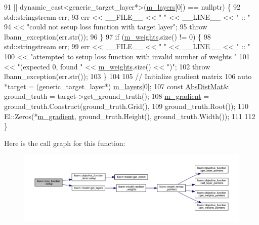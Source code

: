 \begin{DoxyCode}
91       || \textcolor{keyword}{dynamic\_cast<}generic\_target\_layer*\textcolor{keyword}{>}(\hyperlink{classlbann_1_1objective__function__term_a9269cf0a237eacd1e220ba2739f44334}{m\_layers}[0]) == \textcolor{keyword}{nullptr}) \{
92     std::stringstream err;
93     err << \_\_FILE\_\_ << \textcolor{stringliteral}{" "} << \_\_LINE\_\_ << \textcolor{stringliteral}{" :: "}
94         << \textcolor{stringliteral}{"could not setup loss function with target layer"};
95     \textcolor{keywordflow}{throw} lbann\_exception(err.str());
96   \}
97   \textcolor{keywordflow}{if} (\hyperlink{classlbann_1_1objective__function__term_a1d601c29153ae9cb54c585887608f2bf}{m\_weights}.size() != 0) \{
98     std::stringstream err;
99     err << \_\_FILE\_\_ << \textcolor{stringliteral}{" "} << \_\_LINE\_\_ << \textcolor{stringliteral}{" :: "}
100         << \textcolor{stringliteral}{"attempted to setup loss function with invalid number of weights "}
101         << \textcolor{stringliteral}{"(expected 0, found "} << \hyperlink{classlbann_1_1objective__function__term_a1d601c29153ae9cb54c585887608f2bf}{m\_weights}.size() << \textcolor{stringliteral}{")"};
102     \textcolor{keywordflow}{throw} lbann\_exception(err.str());
103   \}
104 
105   \textcolor{comment}{// Initialize gradient matrix}
106   \textcolor{keyword}{auto} *target = (generic\_target\_layer*) \hyperlink{classlbann_1_1objective__function__term_a9269cf0a237eacd1e220ba2739f44334}{m\_layers}[0];
107   \textcolor{keyword}{const} \hyperlink{base_8hpp_a9a697a504ae84010e7439ffec862b470}{AbsDistMat}& ground\_truth = target->get\_ground\_truth();
108   \hyperlink{classlbann_1_1loss__function_ac6ac9f8f2cef7a4daa1b282dba914975}{m\_gradient} = ground\_truth.Construct(ground\_truth.Grid(),
109                                       ground\_truth.Root());
110   El::Zeros(*\hyperlink{classlbann_1_1loss__function_ac6ac9f8f2cef7a4daa1b282dba914975}{m\_gradient}, ground\_truth.Height(), ground\_truth.Width());
111 
112 \}
\end{DoxyCode}
Here is the call graph for this function\+:\nopagebreak
\begin{figure}[H]
\begin{center}
\leavevmode
\includegraphics[width=350pt]{classlbann_1_1loss__function_a17a3629e8519c4215ad776a0c7b522ae_cgraph}
\end{center}
\end{figure}
